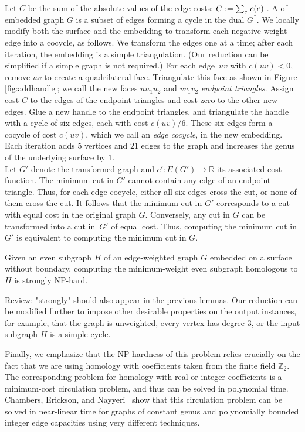 \documentclass[letterpaper,review]{siamart190516}
\def\Z{\mathbb{Z}}
\def\Real{\mathbb{R}}
\def\rnote#1{\color{red}Review: #1 \color{black}}
\begin{document}
{Let $C$ be the sum of the absolute values of the edge costs: $C:= \sum_e \mathopen| c(e) \mathclose|$.
A  of embedded graph $G$ is a subset of edges forming a cycle in the dual $G^*$.
We locally modify both the surface and the embedding to transform each negative-weight edge into a cocycle, as follows.  We transform the edges one at a time; after each iteration, the embedding is a simple triangulation.  (Our reduction can be simplified if a simple graph is not required.)  For each edge~$uv$ with $c(uv)<0$, remove $uv$ to create a quadrilateral face.  Triangulate this face as shown in Figure \ref{fig:addhandle}; we call the new faces $uu_1u_2$ and $vv_1v_2$ \emph{endpoint triangles}.  Assign cost $C$ to the edges of the endpoint triangles and cost zero to the other new edges. Glue a new handle to the endpoint triangles, and triangulate the handle with a cycle of six edges, each with cost $c(uv)/6$.  These six edges form a cocycle of cost $c(uv)$, which we call an \emph{edge cocycle}, in the new embedding.  Each iteration adds $5$ vertices and $21$ edges to the graph and increases the genus of the underlying surface by $1$.
\\
Let $G'$ denote the transformed graph and $c'\colon E(G')\to \Real$ its associated cost function.  The minimum cut in $G'$ cannot contain any edge of an endpoint triangle.  Thus, for each edge cocycle, either all six edges cross the cut, or none of them cross the cut.  It follows that the minimum cut in $G'$ corresponds to a cut with equal cost in the original graph $G$.  Conversely, any cut in $G$ can be transformed into a cut in~$G'$ of equal cost.  Thus, computing the minimum cut in $G'$ is equivalent to computing the minimum cut in $G$.
\color{black}

\begin{theorem}
Given an even subgraph $H$ of an edge-weighted graph $G$ embedded on a surface without boundary, computing the minimum-weight even subgraph homologous to $H$ is strongly {NP}-hard.
\end{theorem}
\rnote{ "strongly" should also appear in the previous lemmas. }
Our reduction can be modified further to impose other desirable properties on the output instances, for example, that the graph is unweighted, every vertex has degree $3$, or the input subgraph $H$ is a simple cycle.

Finally, we emphasize that the {NP}-hardness of this problem relies crucially on the fact that we are using homology with coefficients taken from the finite field $\Z_2$.  The corresponding problem for homology with real or integer coefficients is a minimum-cost circulation problem, and thus can be solved in polynomial time.
Chambers, Erickson, and Nayyeri~\cite{cen-hfcc-12} show that this circulation problem can be solved in near-linear time for graphs of constant genus and polynomially bounded integer edge capacities using very different techniques.


}
\end{document}
